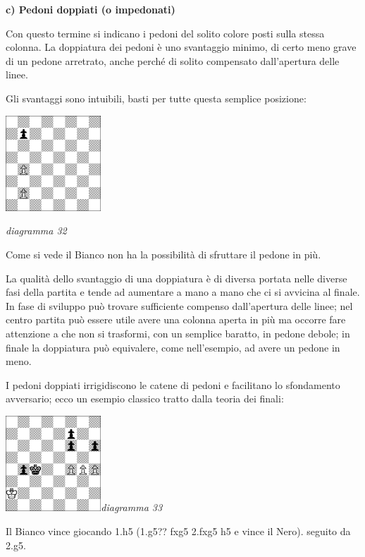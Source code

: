 \documentclass[
]{article}
\begin{document}
\textbf{c) Pedoni doppiati (o impedonati)}

Con questo termine si indicano i pedoni del solito colore posti sulla
stessa colonna. La doppiatura dei pedoni è uno svantaggio minimo, di
certo meno grave di un pedone arretrato, anche perché di solito
compensato dall'apertura delle linee.

Gli svantaggi sono intuibili, basti per tutte questa semplice posizione:

\includegraphics[width=1.40972in,height=1.40972in]{vertopal_109f12be458a423d8f3cc838880eaea2/media/image32.png}

\emph{diagramma 32}

Come si vede il Bianco non ha la possibilità di sfruttare il pedone in
più.

La qualità dello svantaggio di una doppiatura è di diversa portata nelle
diverse fasi della partita e tende ad aumentare a mano a mano che ci si
avvicina al finale. In fase di sviluppo può trovare sufficiente compenso
dall'apertura delle linee; nel centro partita può essere utile avere una
colonna aperta in più ma occorre fare attenzione a che non si trasformi,
con un semplice baratto, in pedone debole; in finale la doppiatura può
equivalere, come nell'esempio, ad avere un pedone in meno.

I pedoni doppiati irrigidiscono le catene di pedoni e facilitano lo
sfondamento avversario; ecco un esempio classico tratto dalla teoria dei
finali:

\includegraphics[width=1.40972in,height=1.40972in]{vertopal_109f12be458a423d8f3cc838880eaea2/media/image33.png}\emph{diagramma
33}

Il Bianco vince giocando 1.h5 (1.g5?? fxg5 2.fxg5 h5 e vince il Nero).
seguito da 2.g5.
\end{document}
